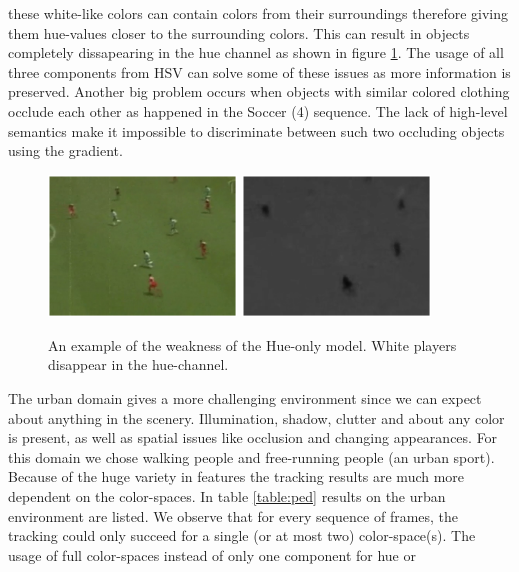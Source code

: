 \documentclass[a4paper,11pt]{article}
\begin{document}
		these white-like colors can contain colors from their surroundings therefore giving them hue-values
		closer to the surrounding colors. This can result in objects completely dissapearing in the hue channel
		as shown in figure \ref{fig:HUE}. The usage of all three components from HSV can solve some of these
		issues as more information is preserved. Another big problem occurs when objects with similar colored clothing occlude each other as happened in the Soccer (4) sequence. The lack of high-level semantics make it impossible to discriminate between such two occluding objects using the gradient.
		\begin{figure}[H]
			\begin{center}
				\includegraphics[width=5cm]{img/example_hue1.eps}
				\includegraphics[width=5cm]{img/example_hue2.eps}\\
			\end{center}
			\caption{
				An example of the weakness of the Hue-only model.
				White players disappear in the hue-channel.
			}
			\label{fig:HUE}
		\end{figure}
		\noindent
		The urban domain gives a more challenging environment since we can expect about anything in the
		scenery. Illumination, shadow, clutter and about any color is present, as well as spatial issues
		like occlusion and changing appearances. For this domain we chose walking people and free-running
		people (an urban sport). Because of the huge variety in features the tracking results are much more
		dependent on the color-spaces. In table \ref{table:ped} results on the urban environment are listed.
		We observe that for every sequence of frames, the tracking could only succeed for a single (or at
		most two) color-space(s). The usage of full color-spaces instead of only one component for hue or
\end{document}
